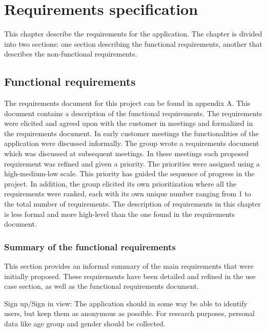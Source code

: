 
\chapter{Requirements specification}

This chapter describe the requirements for the application. The chapter is divided into two sections: one section describing the functional requirements, another that describes the non-functional requirements.

\section{Functional requirements}

The requirements document for this project can be found in appendix A. This document contains a description of the functional requirements. The requirements were elicited and agreed upon with the customer in meetings and formalized in the requirements document. In early customer meetings the functionalities of the application were discussed informally. The group wrote a requirements document which was discussed at subsequent meetings. In these meetings each proposed requirement was refined and given a priority. The priorities were assigned using a high-medium-low scale. This priority has guided the sequence of progress in the project. In addition, the group elicited its own prioritization where all the requirements were ranked, each with its own unique number ranging from 1 to the total number of requirements. The description of requirements in this chapter is less formal and more high-level than the one found in the requirements document. 

\subsection{Summary of the functional requirements}
\label{subsec:summary_functional_requirements}

This section provides an informal summary of the main requirements that were initially proposed. These requirements have been detailed and refined in the use case section, as well as the functional requirements document. \newline

Sign up/Sign in view: The application should in some way be able to identify users, but keep them as anonymous as possible. For research purposes, personal data like age group and gender should be collected.\newline

